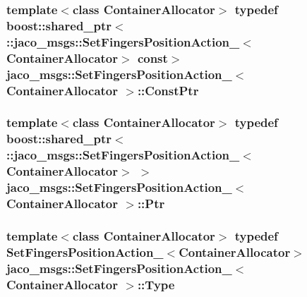 \subsubsection[{\texorpdfstring{Const\+Ptr}{ConstPtr}}]{\setlength{\rightskip}{0pt plus 5cm}template$<$class Container\+Allocator$>$ typedef boost\+::shared\+\_\+ptr$<$ \+::{\bf jaco\+\_\+msgs\+::\+Set\+Fingers\+Position\+Action\+\_\+}$<$Container\+Allocator$>$ const$>$ {\bf jaco\+\_\+msgs\+::\+Set\+Fingers\+Position\+Action\+\_\+}$<$ Container\+Allocator $>$\+::{\bf Const\+Ptr}}\hypertarget{structjaco__msgs_1_1SetFingersPositionAction___a96e6f9cedc0f5b6829fb6bd0c18249a7}{}\label{structjaco__msgs_1_1SetFingersPositionAction___a96e6f9cedc0f5b6829fb6bd0c18249a7}
\subsubsection[{\texorpdfstring{Ptr}{Ptr}}]{\setlength{\rightskip}{0pt plus 5cm}template$<$class Container\+Allocator$>$ typedef boost\+::shared\+\_\+ptr$<$ \+::{\bf jaco\+\_\+msgs\+::\+Set\+Fingers\+Position\+Action\+\_\+}$<$Container\+Allocator$>$ $>$ {\bf jaco\+\_\+msgs\+::\+Set\+Fingers\+Position\+Action\+\_\+}$<$ Container\+Allocator $>$\+::{\bf Ptr}}\hypertarget{structjaco__msgs_1_1SetFingersPositionAction___a52cbdae3469a8869ce75be3d47ded03d}{}\label{structjaco__msgs_1_1SetFingersPositionAction___a52cbdae3469a8869ce75be3d47ded03d}
\subsubsection[{\texorpdfstring{Type}{Type}}]{\setlength{\rightskip}{0pt plus 5cm}template$<$class Container\+Allocator$>$ typedef {\bf Set\+Fingers\+Position\+Action\+\_\+}$<$Container\+Allocator$>$ {\bf jaco\+\_\+msgs\+::\+Set\+Fingers\+Position\+Action\+\_\+}$<$ Container\+Allocator $>$\+::{\bf Type}}\hypertarget{structjaco__msgs_1_1SetFingersPositionAction___aec7f755e153f8eb967222c3617a00e27}{}\label{structjaco__msgs_1_1SetFingersPositionAction___aec7f755e153f8eb967222c3617a00e27}


